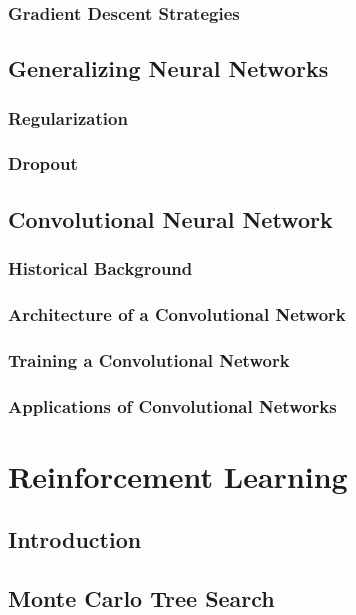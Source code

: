 \documentclass[titlepage]{article}
\begin{document}
\subsubsection{Gradient Descent Strategies}

\newpage

\subsection{Generalizing Neural Networks}
\subsubsection{Regularization}
\subsubsection{Dropout}

\newpage

\subsection{Convolutional Neural Network}
\subsubsection{Historical Background}
\subsubsection{Architecture of a Convolutional Network}
\subsubsection{Training a Convolutional Network}
\subsubsection{Applications of Convolutional Networks}

\newpage

\section{Reinforcement Learning}

\subsection{Introduction}
\subsection{Monte Carlo Tree Search}
\end{document}
